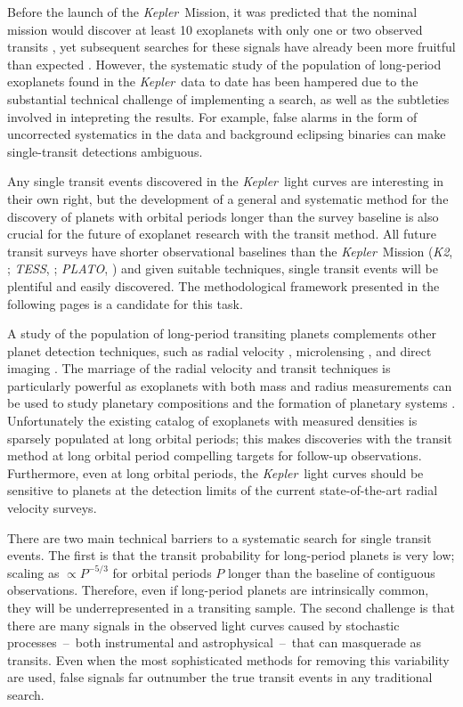 \documentclass[manuscript, letterpaper]{aastex6}
\newcommand{\project}[1]{\textsl{#1}}
\newcommand{\kepler}{\project{Kepler}}
\newcommand{\KT}{\project{K2}}
\newcommand{\tess}{\project{TESS}}
\newcommand{\plato}{\project{PLATO}}
\begin{document}
Before the launch of the \kepler\ Mission, it was predicted that the nominal
mission would discover at least 10 exoplanets with only one or two observed
transits \citep{Yee:2008}, yet subsequent searches for these signals have
already been more fruitful than expected \citep{Wang:2015, Uehara:2016}.
However, the systematic study of the population of long-period exoplanets
found in the \kepler\ data to date has been hampered due to the
substantial technical challenge of implementing a search, as well as the
subtleties involved in intepreting the results. For example,
false alarms in the form of uncorrected systematics in the data and background
eclipsing binaries can make single-transit detections ambiguous.

Any single transit events discovered in the \kepler\ light curves are
interesting in their own right, but the development of a general and
systematic method for the discovery of planets with orbital periods longer
than the survey baseline is also crucial for the future of exoplanet research
with the transit method.
All future transit surveys have shorter observational baselines than the
\kepler\ Mission (\KT, \citealt{Howell:2014}; \tess, \citealt{Ricker:2015};
\plato, \citealt{Rauer:2014}) and given suitable techniques, single transit
events will be plentiful and easily discovered.
The methodological framework presented in the following pages is a candidate
for this task.

A study of the population of long-period transiting planets complements other
planet detection techniques, such as radial velocity \citep[for
example][]{Cumming:2008, Knutson:2014, Bryan:2016}, microlensing \citep[for
example][]{Gould:2010, Cassan:2012, Clanton:2014, Shvartzvald:2016}, and
direct imaging \citep[for example][]{Bowler:2016}.
The marriage of the radial velocity and transit techniques is particularly
powerful as exoplanets with both mass and radius measurements can be used to
study planetary compositions and the formation of planetary systems \citep[for
example][]{Weiss:2014, Rogers:2015, Wolfgang:2016}.
Unfortunately the existing catalog of exoplanets with measured densities is sparsely
populated at long orbital periods;  this makes discoveries with the transit method
at long orbital period compelling targets for follow-up observations.
Furthermore, even at long orbital periods, the \kepler\ light curves should be
sensitive to planets at the detection limits of the current state-of-the-art
radial velocity surveys.

There are two main technical barriers to a systematic search for single
transit events.
The first is that the transit probability for long-period planets is very low;
scaling as $\propto P^{-5/3}$ for orbital periods $P$ longer than the
baseline of contiguous observations.
Therefore, even if long-period planets are intrinsically common, they will
be underrepresented in a transiting sample.
The second challenge is that there are many signals in the observed light
curves caused by stochastic processes~--~both instrumental and
astrophysical~--~that can masquerade as transits.
Even when the most sophisticated methods for removing this variability are
used, false signals far outnumber the true transit events in any traditional
search.
\end{document}
